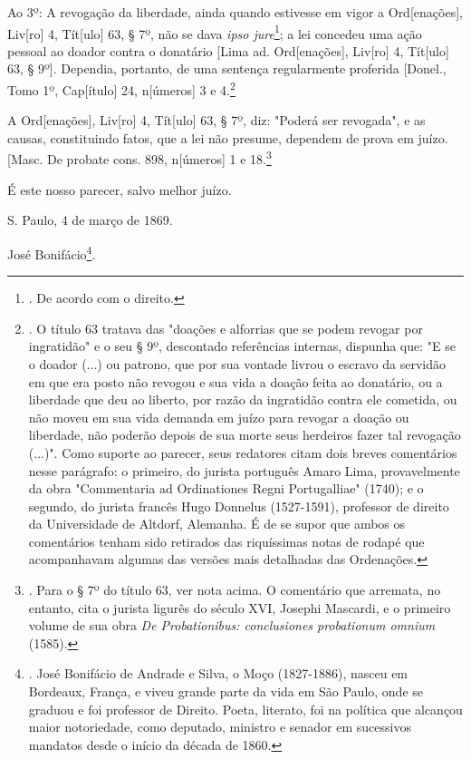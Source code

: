 Ao 3º: A revogação da liberdade, ainda quando estivesse em vigor a
Ord{[}enações{]}, Liv{[}ro{]} 4, Tít{[}ulo{]} 63, § 7º, não se dava
\emph{ipso jure}\footnote{. De acordo com o direito.}; a lei concedeu
uma ação pessoal ao doador contra o donatário {[}Lima ad.
Ord{[}enações{]}, Liv{[}ro{]} 4, Tít{[}ulo{]} 63, § 9º{]}. Dependia,
portanto, de uma sentença regularmente proferida {[}Donel., Tomo 1º,
Cap{[}ítulo{]} 24, n{[}úmeros{]} 3 e 4.\footnote{. O título 63 tratava
  das "doações e alforrias que se podem revogar por ingratidão" e o seu
  § 9º, descontado referências internas, dispunha que: "E se o doador
  (...) ou patrono, que por sua vontade livrou o escravo da servidão em
  que era posto não revogou e sua vida a doação feita ao donatário, ou a
  liberdade que deu ao liberto, por razão da ingratidão contra ele
  cometida, ou não moveu em sua vida demanda em juízo para revogar a
  doação ou liberdade, não poderão depois de sua morte seus herdeiros
  fazer tal revogação (...)". Como suporte ao parecer, seus redatores
  citam dois breves comentários nesse parágrafo: o primeiro, do jurista
  português Amaro Lima, provavelmente da obra "Commentaria ad
  Ordinationes Regni Portugalliae" (1740); e o segundo, do jurista
  francês Hugo Donnelus (1527-1591), professor de direito da
  Universidade de Altdorf, Alemanha. É de se supor que ambos os
  comentários tenham sido retirados das riquíssimas notas de rodapé que
  acompanhavam algumas das versões mais detalhadas das Ordenações.}

A Ord{[}enações{]}, Liv{[}ro{]} 4, Tít{[}ulo{]} 63, § 7º, diz: "Poderá
ser revogada", e as causas, constituindo fatos, que a lei não presume,
dependem de prova em juízo. {[}Masc. De probate cons. 898, n{[}úmeros{]}
1 e 18.\footnote{. Para o § 7º do título 63, ver nota acima. O
  comentário que arremata, no entanto, cita o jurista ligurês do século
  XVI, Josephi Mascardi, e o primeiro volume de sua obra \emph{De
  Probationibus: conclusiones probationum omnium} (1585).}

É este nosso parecer, salvo melhor juízo.

S. Paulo, 4 de março de 1869.

José Bonifácio\footnote{. José Bonifácio de Andrade e Silva, o Moço
  (1827-1886), nasceu em Bordeaux, França, e viveu grande parte da vida
  em São Paulo, onde se graduou e foi professor de Direito. Poeta,
  literato, foi na política que alcançou maior notoriedade, como
  deputado, ministro e senador em sucessivos mandatos desde o início da
  década de 1860.}.

